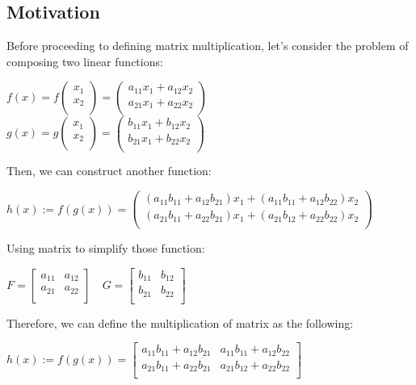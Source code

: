 \documentclass[UTF8,a4paper,11pt]{amsbook}
\begin{document}
\subsection{Motivation}
Before proceeding to defining matrix multiplication, let's consider the problem of composing two linear functions:
\begin{center}
$f(x)=f
\left(
\begin{array}{c}
x_{1} \\ 
x_{2} \\
\end{array}
\right)=
\left(
\begin{array}{c}
a_{11}x_1+a_{12}x_{2} \\ 
a_{21}x_1+a_{22}x_{2} \\
\end{array}
\right)
$\\
$
g(x)=g
\left(
\begin{array}{c}
x_{1} \\ 
x_{2} \\
\end{array}
\right)=
\left(
\begin{array}{c}
b_{11}x_1+b_{12}x_{2} \\ 
b_{21}x_1+b_{22}x_{2} \\
\end{array}
\right)
$
\end{center}
Then, we can construct another function:
\begin{center}
$h(x):=
f(g(x))=
\left(
\begin{array}{c}
(a_{11}b_{11}+a_{12}b_{21})x_1+(a_{11}b_{11}+a_{12}b_{22})x_{2} \\ 
(a_{21}b_{11}+a_{22}b_{21})x_1+(a_{21}b_{12}+a_{22}b_{22})x_{2} \\
\end{array}
\right)
$
\end{center}
Using matrix to simplify those function:
\begin{center}
$F=
\left[
\begin{array}{cc}
a_{11} & a_{12} \\ 
a_{21} & a_{22} \\
\end{array}
\right] \quad
G=
\left[
\begin{array}{cc}
b_{11} & b_{12} \\ 
b_{21} & b_{22} \\
\end{array}
\right]
$
\end{center}
Therefore, we can define the multiplication of matrix as the following:
\begin{center}
$h(x):=
f(g(x))=
\left[
\begin{array}{cc}
a_{11}b_{11}+a_{12}b_{21} & a_{11}b_{11}+a_{12}b_{22} \\ 
a_{21}b_{11}+a_{22}b_{21} & a_{21}b_{12}+a_{22}b_{22} \\
\end{array}
\right]
$
\end{center}
\end{document}
